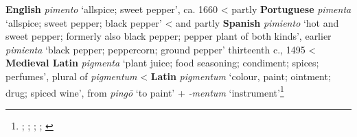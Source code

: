 \begin{etymology}\label{ety:pimento}
\textbf{English} \textit{pimento} `allspice; sweet pepper', ca. 1660
< partly \textbf{Portuguese} \textit{pimenta} `allspice; sweet pepper; black pepper'
< and partly \textbf{Spanish} \textit{pimiento} `hot and sweet pepper; formerly also black pepper; pepper plant of both kinds', earlier \textit{pimienta} `black pepper; peppercorn; ground pepper' thirteenth c., 1495
< \textbf{Medieval Latin} \textit{pigmenta} `plant juice; food seasoning; condiment; spices; perfumes', plural of \textit{pigmentum}
< \textbf{Latin} \textit{pigmentum} `colour, paint; ointment; drug; spiced wine', from \textit{pingō} `to paint' + \textit{-mentum} `instrument'\footnote{\textcite[s.v. pimento]{oed}; \textcite[s.v. pimento]{oed}; \textcite[s.v. pimiento]{oed}; \textcites[415]{gomez_de_silva_elseviers_1985}[495]{corominas_breve_1987}; \textcite[s.v. pigmentum]{lewis_latin_1879}}
\end{etymology}
